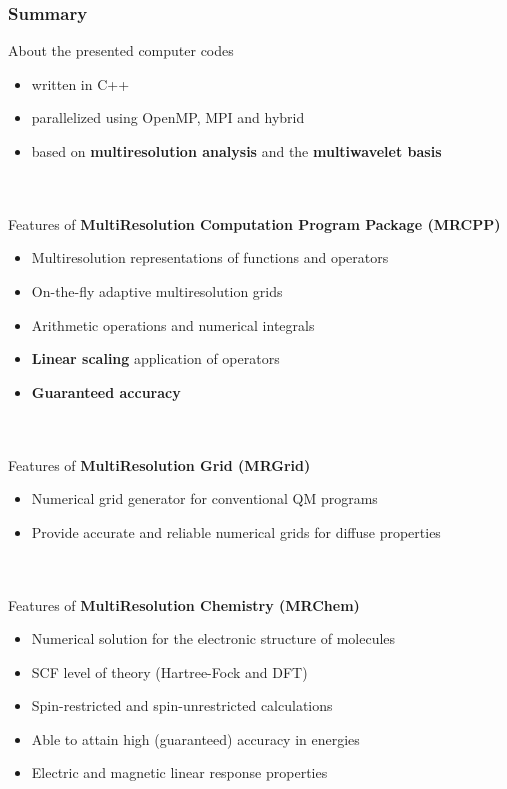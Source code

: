 \begin{frame}
    \frametitle{Summary}
    About the presented computer codes
    \begin{itemize}
        \item   written in C++
        \item   parallelized using OpenMP, MPI and hybrid
        \item   based on \textbf{multiresolution analysis} and the \textbf{multiwavelet basis}
    \end{itemize}
    \ \\
    \ \\
    \pause
    Features of \textbf{MultiResolution Computation Program Package (MRCPP)}
    \begin{itemize}
        \item   Multiresolution representations of functions and operators
        \item   On-the-fly adaptive multiresolution grids
        \item   Arithmetic operations and numerical integrals
        \item   \textbf{Linear scaling} application of operators
        \item   \textbf{Guaranteed accuracy}
    \end{itemize}
    \ \\
    \ \\
    \pause
    Features of \textbf{MultiResolution Grid (MRGrid)}
    \begin{itemize}
        \item   Numerical grid generator for conventional QM programs
        \item   Provide accurate and reliable numerical grids for diffuse properties
    \end{itemize}
    \ \\
    \ \\
    \pause
    Features of \textbf{MultiResolution Chemistry (MRChem)}
    \begin{itemize}
        \item   Numerical solution for the electronic structure of molecules
        \item   SCF level of theory (Hartree-Fock and DFT)
        \item   Spin-restricted and spin-unrestricted calculations
        \item   Able to attain high (guaranteed) accuracy in energies
	\item	Electric and magnetic linear response properties
    \end{itemize}
\end{frame}

